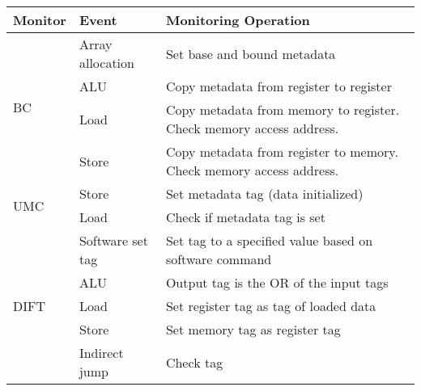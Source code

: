 

\begin{tabular}{|l|l|l|}
\hline

{\bf Monitor} & {\bf Event} & {\bf Monitoring Operation} \\ \hline \hline

\multirow{4}{*}{BC}  
 & Array allocation & Set base and bound metadata \\ \cline{2-3}
 & ALU & Copy metadata from register to register \\  \cline{2-3}
 & Load & Copy metadata from memory to register. Check memory access address. \\ \cline{2-3}
 & Store & Copy metadata from register to memory. Check memory access address. \\ 
\hline\hline

\multirow{2}{*}{UMC}  
 & Store & Set metadata tag (data initialized) \\ \cline{2-3}
 & Load & Check if metadata tag is set \\ 
\hline\hline

\multirow{5}{*}{DIFT}  
 & Software set tag & Set tag to a specified value based on software command \\ \cline{2-3}
 & ALU & Output tag is the OR of the input tags \\ \cline{2-3}
 & Load & Set register tag as tag of loaded data \\ \cline{2-3}
 & Store & Set memory tag as register tag \\ \cline{2-3}
 & Indirect jump & Check tag \\ 
 \hline


% 

\end{tabular}
